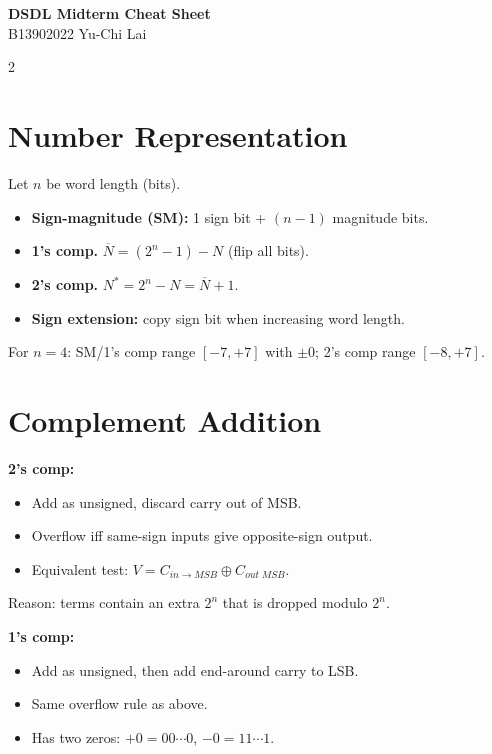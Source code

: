 \documentclass[10pt]{article}
\title{\mytitle}
\author{\textbf{\myauthor}}
\date{}
\newcommand{\mytitle}{DSDL Midterm Cheat Sheet}
\newcommand{\myauthor}{B13902022 Yu-Chi Lai}
\begin{document}
{\small
\begin{center}
{\Large\textbf{\mytitle}}\\[-0.2em]
\myauthor
\end{center}

\begin{multicols}{2}

\section*{Number Representation}
Let $n$ be word length (bits).
\begin{itemize}
    \item \textbf{Sign-magnitude (SM):} 1 sign bit + $(n-1)$ magnitude bits.
    \item \textbf{1's comp.} $\overline{N}=(2^n-1)-N$ (flip all bits).
    \item \textbf{2's comp.} $N^*=2^n-N=\overline{N}+1$.
    \item \textbf{Sign extension:} copy sign bit when increasing word length.
\end{itemize}
For $n=4$: SM/1's comp range $[-7,+7]$ with $\pm0$; 2's comp range $[-8,+7]$.

\section*{Complement Addition}
\textbf{2's comp:}
\begin{itemize}
    \item Add as unsigned, discard carry out of MSB.
    \item Overflow iff same-sign inputs give opposite-sign output.
    \item Equivalent test: $V=C_{in\to MSB}\oplus C_{out\;MSB}$.
\end{itemize}
Reason: terms contain an extra $2^n$ that is dropped modulo $2^n$.

\textbf{1's comp:}
\begin{itemize}
    \item Add as unsigned, then add end-around carry to LSB.
    \item Same overflow rule as above.
    \item Has two zeros: $+0=00\cdots0$, $-0=11\cdots1$.
\end{itemize}


\end{multicols}}
\end{document}

